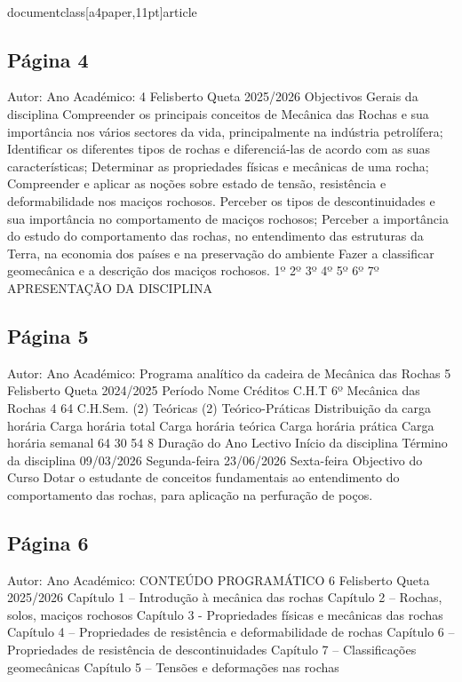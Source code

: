 \\documentclass[a4paper,11pt]{article}
\begin{document}
\subsection*{Página 4}
Autor:
Ano Académico:
4
Felisberto Queta
2025/2026
Objectivos Gerais da disciplina
Compreender os principais conceitos de Mecânica das Rochas e sua importância nos 
vários sectores da vida, principalmente na indústria petrolífera;
Identificar os diferentes tipos de rochas e diferenciá-las de acordo com as suas 
características;
Determinar as propriedades físicas e mecânicas de uma rocha;
Compreender e aplicar as noções sobre estado de tensão,  resistência e 
deformabilidade nos maciços rochosos. 
Perceber os tipos de descontinuidades e sua importância no comportamento de 
maciços rochosos; 
Perceber a importância do estudo do comportamento das rochas, no entendimento 
das estruturas da Terra, na economia dos países e na preservação do ambiente
Fazer a classificar geomecânica e a descrição dos maciços rochosos.
1º
2º
3º
4º
5º
6º
7º
APRESENTAÇÃO DA DISCIPLINA



\subsection*{Página 5}
Autor:
Ano Académico:
Programa analítico da cadeira de Mecânica das Rochas
5
Felisberto Queta
2024/2025
Período 
Nome
Créditos 
C.H.T 
6º
Mecânica das Rochas
4
64
C.H.Sem. 
(2) Teóricas (2) Teórico-Práticas 
Distribuição da carga horária
Carga horária total 
Carga horária teórica
Carga horária prática 
Carga horária 
semanal 
64
30
54
8
Duração do Ano Lectivo
Início da disciplina
Término da disciplina
09/03/2026 Segunda-feira
23/06/2026 Sexta-feira
Objectivo do Curso
Dotar o estudante de conceitos fundamentais ao entendimento do comportamento das
rochas, para aplicação na perfuração de poços.



\subsection*{Página 6}
Autor:
Ano Académico:
CONTEÚDO PROGRAMÁTICO
6
Felisberto Queta
2025/2026
Capítulo 1 – Introdução à mecânica das rochas 
Capítulo 2 – Rochas, solos, maciços rochosos
Capítulo 3 - Propriedades físicas e mecânicas das rochas 
Capítulo 4 – Propriedades de resistência e deformabilidade de rochas
Capítulo 6 – Propriedades de resistência de descontinuidades
Capítulo 7 – Classificações geomecânicas
Capítulo 5 – Tensões e deformações nas rochas
\end{document}
